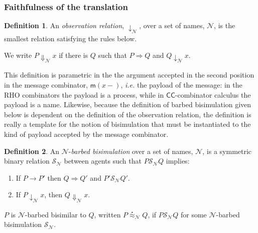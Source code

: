\documentclass[submission,copyright,creativecommons]{eptcs}
\newcommand{\ccomb}{$\mathsf{CC}$-combinator calculus}
\newcommand{\wbbisim}{\stackrel{\centerdot}{\approx}} %
\newcommand{\nameeq}{\mathbin{\equiv_N}}
\newcommand{\binpar}[2]{#1 | #2}
\newcommand{\prefix}[3]{\mathsf{for}(#2 \leftarrow #1?) #3}
\newcommand{\red}{\rightarrow}
\newcommand{\wred}{\Rightarrow}
\newcommand{\rhoc}{$\rho$-calculus}
\theoremstyle{definition}
\newtheorem{definition}{Definition}
\theoremstyle{remark}
\theoremstyle{remark}
\begin{document}
\subsubsection{Faithfulness of the translation}

\begin{definition}
An \emph{observation relation}, $\downarrow_{\mathcal{N}}$, over a set
of names, $\mathcal N$, is the smallest relation satisfying the rules
below.


We write $P \Downarrow_{\mathcal{N}} x$ if there is $Q$ such that 
$P \wred Q$ and $Q \downarrow_{\mathcal{N}} x$.
\end{definition}

This definition is parametric in the the argument accepted in the
second position in the message combinator, $\mathsf{m}(x-)$, {\em i.e.} the payload
of the message: in the RHO combinators the payload is a process,
while in {\ccomb} the payload is a name. Likewise, because the
definition of barbed bisimulation given below is dependent on the
definition of the observation relation, the definition is really a
template for the notion of bisimulation that must be instantiated to
the kind of payload accepted by the message combinator.


\begin{definition}
An  ${\mathcal N}$-\emph{barbed bisimulation} over a set of names, ${\mathcal N}$, is a symmetric binary relation 
${\mathcal S}_{\mathcal N}$ between agents such that $P{\mathcal S}_{\mathcal N}Q$ implies:
\begin{enumerate}
\item If $P \red P'$ then $Q \wred Q'$ and $P'{\mathcal S}_{\mathcal N} Q'$.
\item If $P\downarrow_{\mathcal N} x$, then $Q\Downarrow_{\mathcal N} x$.
\end{enumerate}
$P$ is ${\mathcal N}$-barbed bisimilar to $Q$, written
$P \wbbisim_{\mathcal N} Q$, if $P {\mathcal S}_{\mathcal N} Q$ for some ${\mathcal N}$-barbed bisimulation ${\mathcal S}_{\mathcal N}$.
\end{definition}
\end{document}
